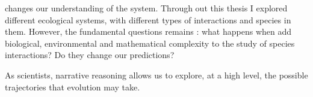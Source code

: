 \begin{refsection}
 changes our understanding of the system. Through out this thesis I explored different ecological systems, with different types of interactions and species in them. However, the fundamental questions remains : what happens when add biological, environmental and mathematical complexity to the study of species interactions? Do they change our predictions?

 As scientists, narrative reasoning allows us to explore, at a high level, the possible trajectories that evolution may take.

\printbibliography
\end{refsection}
